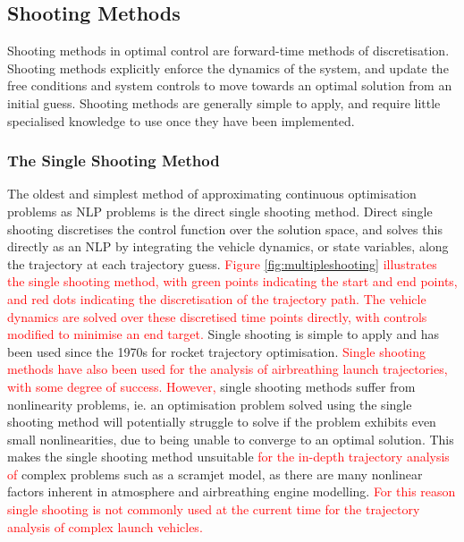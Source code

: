 \subsection{Shooting Methods}

Shooting methods in optimal control are forward-time methods of discretisation\cite{Kelly2015}. Shooting methods explicitly enforce the dynamics of the system, and update the free conditions and system controls to move towards an optimal solution from an initial guess\cite{Kelly2015}. Shooting methods are generally simple to apply, and require little specialised knowledge to use once they have been implemented. 


\subsubsection{The Single Shooting Method}

The oldest and simplest method of approximating continuous optimisation problems as NLP problems is the direct single shooting method. Direct single shooting discretises the control function over the solution space, and solves this directly as an NLP by integrating the vehicle dynamics, or state variables, along the trajectory at each trajectory guess\cite{Betts1998,Kelly2015,Rao2009,Fasano2013}. \textcolor{red}{Figure \ref{fig:multipleshooting} illustrates the single shooting method, with green points indicating the start and end points, and red dots indicating the discretisation of the trajectory path. The vehicle dynamics are solved over these discretised time points directly, with controls modified to minimise an end target.} Single shooting is simple to apply and has been used since the 1970s for rocket trajectory optimisation\cite{jezewski1971}. \textcolor{red}{Single shooting methods have also been used for the analysis of airbreathing launch trajectories, with some degree of success\cite{Powell1991,Bradford2000,Hyperion,Bradford2002,Fujikawa2017}. However,} single shooting methods suffer from nonlinearity problems, ie. an optimisation problem solved using the single shooting method will potentially struggle to solve if the problem exhibits even small nonlinearities, due to being unable to converge to an optimal solution. This makes the single shooting method unsuitable \textcolor{red}{for the in-depth trajectory analysis of} complex problems such as a scramjet model, as there are many nonlinear factors inherent in atmosphere and airbreathing engine modelling. \textcolor{red}{For this reason single shooting is not commonly used at the current time for the trajectory analysis of complex launch vehicles.}



